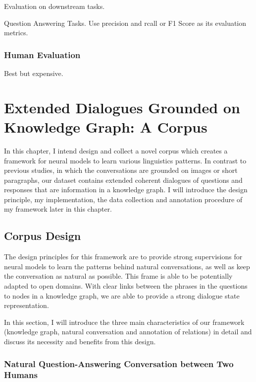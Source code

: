 \documentclass[bsc,frontabs,twoside,singlespacing,parskip,deptreport]{infthesis}     %
\begin{document}
Evaluation on downstream tasks.


Question Answering Tasks. Use precision and rcall or F1 Score as its evaluation metrics.

\subsection{Human Evaluation}

Best but expensive.


\chapter{Extended Dialogues Grounded on Knowledge Graph: A Corpus}

In this chapter, I intend design and collect a novel corpus which creates a framework for neural models to learn various linguistics patterns. In contrast to previous studies\cite{reddy2019coqa,de2017guesswhat,saha2018complex,shekhar2017foil}, in which the conversations are grounded on images or short paragraphs, our dataset contains extended coherent dialogues of questions and responses that are information in a knowledge graph. I will introduce the design principle, my implementation, the data collection and annotation procedure of my framework later in this chapter.

\section{Corpus Design}

The design principles for this framework are to provide strong supervisions for neural models to learn the patterns behind natural conversations, as well as keep the conversation as natural as possible. This frame is able to be potentially adapted to open domains. With clear links between the phrases in the questions to nodes in a knowledge graph, we are able to provide a strong dialogue state representation.

In this section, I will introduce the three main characteristics of our framework (knowledge graph, natural conversation and annotation of relations) in detail and discuss its necessity and benefits from this design.


\subsection{Natural Question-Answering Conversation between Two Humans}
\end{document}
